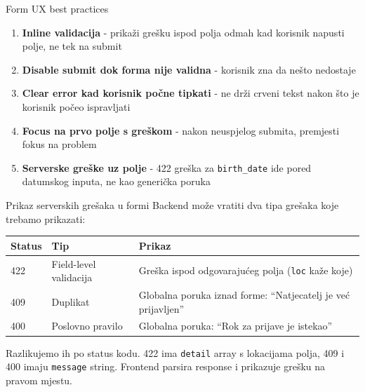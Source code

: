 \begin{frame}{Form UX best practices}
\begin{enumerate}
  \item \textbf{Inline validacija} - prikaži grešku ispod polja odmah kad korisnik napusti polje, ne tek na submit
  \item \textbf{Disable submit dok forma nije validna} - korisnik zna da nešto nedostaje
  \item \textbf{Clear error kad korisnik počne tipkati} - ne drži crveni tekst nakon što je korisnik počeo ispravljati
  \item \textbf{Focus na prvo polje s greškom} - nakon neuspjelog submita, premjesti fokus na problem
  \item \textbf{Serverske greške uz polje} - 422 greška za \texttt{birth\_date} ide pored datumskog inputa, ne kao generička poruka
\end{enumerate}
\end{frame}

\begin{frame}{Prikaz serverskih grešaka u formi}
Backend može vratiti dva tipa grešaka koje trebamo prikazati:

\vspace{0.4em}
\begin{tabular}{@{}llp{5.5cm}@{}}
  \toprule
  \textbf{Status} & \textbf{Tip} & \textbf{Prikaz} \\
  \midrule
  422 & Field-level validacija & Greška ispod odgovarajućeg polja (\texttt{loc} kaže koje) \\
  409 & Duplikat & Globalna poruka iznad forme: \enquote{Natjecatelj je već prijavljen} \\
  400 & Poslovno pravilo & Globalna poruka: \enquote{Rok za prijave je istekao} \\
  \bottomrule
\end{tabular}

\vspace{0.6em}
Razlikujemo ih po status kodu. 422 ima \texttt{detail} array s lokacijama polja, 409 i 400 imaju \texttt{message} string. Frontend parsira response i prikazuje grešku na pravom mjestu.
\end{frame}

